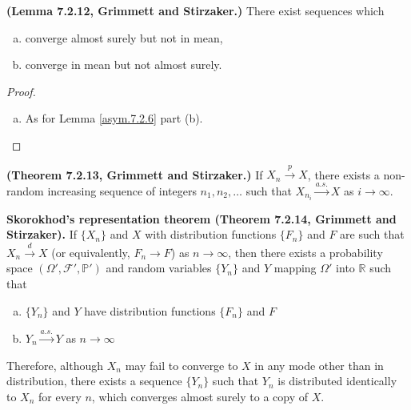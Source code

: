 \begin{lemma}\textbf{(Lemma 7.2.12, Grimmett and Stirzaker.)} There exist sequences which

\begin{enumerate}[(a)]
\item converge almost surely but not in mean,
\item converge in mean but not almost surely.
\end{enumerate}
\end{lemma}
\begin{proof}
\begin{enumerate}[(a)]

\item As for Lemma \ref{asym.7.2.6} part (b).
\end{enumerate}
\end{proof}

\begin{theorem} \textbf{(Theorem 7.2.13, Grimmett and Stirzaker.)} If \(X_n \xrightarrow{p} X\), there exists a non-random increasing sequence of integers \(n_1, n_2, \ldots\) such that \(X_{n_i} \xrightarrow{a.s.} X\) as \(i \to \infty\). \end{theorem}

\begin{theorem}\textbf{Skorokhod's representation theorem (Theorem 7.2.14, Grimmett and Stirzaker).} If \(\{X_n\}\) and \(X\) with distribution functions \(\{F_n\}\) and \(F\) are such that \(X_n \xrightarrow{d} X\) (or equivalently, \(F_n \to F\)) as \(n \to \infty\), then there exists a probability space \((\Omega', \mathcal{F}', \mathbb{P}')\) and random variables \(\{Y_n\}\) and \(Y\) mapping \(\Omega'\) into \(\mathbb{R}\) such that

\begin{enumerate}[(a)]

\item \(\{Y_n\}\) and \(Y\) have distribution functions \(\{F_n\}\) and \(F\)

\item \(Y_n \xrightarrow{a.s.} Y\) as \(n \to \infty\)

\end{enumerate}

Therefore, although \(X_n\) may fail to converge to \(X\) in any mode other than in distribution, there exists a sequence \(\{Y_n\}\) such that \(Y_n\) is distributed identically to \(X_n\) for every \(n\), which converges almost surely to a copy of \(X\).
\end{theorem}

